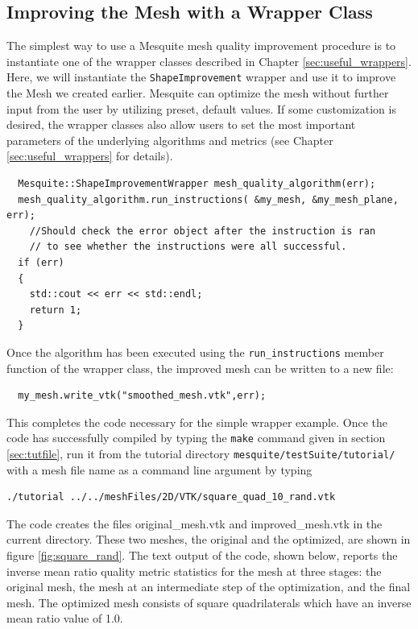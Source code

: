\subsection{Improving the Mesh with a Wrapper Class}
\label{sec:tutWrapper}
The simplest way to use a Mesquite mesh quality improvement
procedure is to instantiate one of the wrapper classes described in Chapter 
\ref{sec:useful_wrappers}. Here, we will instantiate the
\texttt{ShapeImprovement} wrapper and use it to improve 
the Mesh we created earlier.  Mesquite can optimize the mesh
without further input from the user by utilizing preset, default
values.  If some customization is desired, the wrapper classes also
allow users to set the most important parameters of the underlying
algorithms and metrics (see Chapter 
\ref{sec:useful_wrappers} for details).
\begin{verbatim}
  Mesquite::ShapeImprovementWrapper mesh_quality_algorithm(err);
  mesh_quality_algorithm.run_instructions( &my_mesh, &my_mesh_plane, err);
    //Should check the error object after the instruction is ran
    // to see whether the instructions were all successful.
  if (err) 
  {
    std::cout << err << std::endl;
    return 1;
  }

\end{verbatim}
Once the algorithm has been executed using the {\tt run\_instructions} member
function of the wrapper class, the improved mesh can be written to a new
file:
\begin{verbatim}
  my_mesh.write_vtk("smoothed_mesh.vtk",err); 
\end{verbatim}
This completes the code necessary for the simple wrapper example.  Once
the code has successfully compiled by typing the {\tt make} command given in
section \ref{sec:tutfile}, 
run it from the tutorial directory \texttt{mesquite/testSuite/tutorial/}
with a mesh file name as a command line 
argument by typing 
\begin{verbatim}
./tutorial ../../meshFiles/2D/VTK/square_quad_10_rand.vtk
\end{verbatim}
The code creates the files original\_mesh.vtk
and improved\_mesh.vtk in the current directory.  These two meshes, the
original and the optimized, are
shown in figure \ref{fig:square_rand}.  The text output of the code,
shown below, reports the inverse mean ratio quality metric statistics for
the mesh at three stages:  the original mesh, the mesh at an intermediate
step of the optimization, and the final mesh.  The optimized mesh consists
of square quadrilaterals which have an inverse mean ratio value of 1.0.
